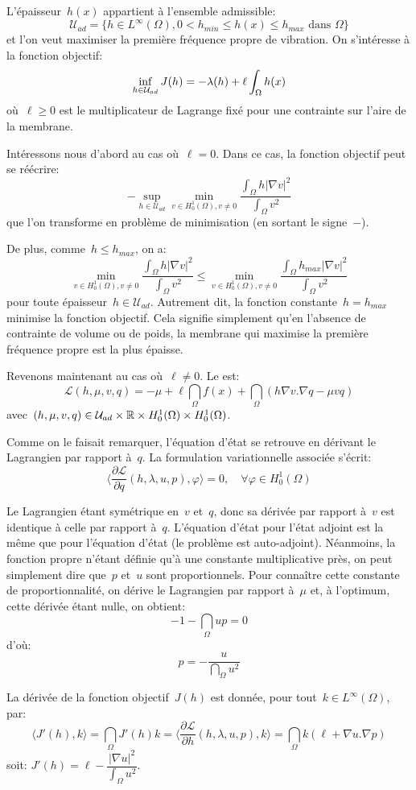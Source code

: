L'épaisseur~$h(x)$ appartient à l'ensemble admissible:
\[ \mathcal{U}_{ad} = \{ h\in L^\infty(\Omega), 0< h_{min}\le h(x)\le h_{max} \text{ dans }\Omega \} \]
et l'on veut maximiser la première fréquence propre de vibration. On s'intéresse à la fonction objectif:
\[\colorblue \inf_{h\in\mathcal{U}_{ad}} J(h) = -\lambda(h)+\ell \dint_\Omega h(x) \]
où~$\ell\ge0$ est le multiplicateur de Lagrange fixé pour une contrainte sur l'aire de la membrane.

\medskip
Intéressons nous d'abord au cas où~$\ell=0$. Dans ce cas, la fonction objectif peut se réécrire:
\[ -\sup_{h\in\mathcal{U}_{ad}} \min_{v\in H^1_0(\Omega), v\ne0} \dfrac{\int_\Omega h|\nabla v|^2}{\int_\Omega v^2} \]
que l'on transforme en problème de minimisation (en sortant le signe~$-$).

De plus, comme~$h\le h_{max}$, on a:
\[ \min_{v\in H^1_0(\Omega), v\ne0} \dfrac{\int_\Omega h|\nabla v|^2}{\int_\Omega v^2}
\le \min_{v\in H^1_0(\Omega), v\ne0} \dfrac{\int_\Omega h_{max}|\nabla v|^2}{\int_\Omega v^2} \]
pour toute épaisseur~$h\in\mathcal{U}_{ad}$. Autrement dit, la fonction constante~$h=h_{max}$ minimise la fonction objectif. Cela signifie simplement qu'en l'absence de contrainte de volume ou de poids, la membrane qui maximise la première fréquence propre est la plus épaisse.

\medskip
Revenons maintenant au cas où~$\ell\ne0$. Le  est:
\[ \mathcal{L}(h,\mu,v,q) = -\mu +\ell\dint_\Omega f(x)
+\dint_\Omega (h\nabla v.\nabla q -\mu vq)\]
avec~$(h,\mu,v,q)\in\mathcal{U}_{ad}\times\mathbb R\times H^1_0(\Omega)\times H^1_0(\Omega)$.

Comme on le faisait remarquer, l'équation d'état se retrouve en dérivant le Lagrangien par rapport à~$q$. La formulation variationnelle associée s'écrit:
\[ \langle\dfrac{\partial\mathcal{L}}{\partial q}(h,\lambda,u,p),\varphi\rangle=0,
\quad \forall \varphi\in H^1_0(\Omega) \]

Le Lagrangien étant symétrique en~$v$ et~$q$, donc sa dérivée par rapport à~$v$ est identique à celle par rapport à~$q$. L'équation d'état pour l'état adjoint est la même que pour l'équation d'état (le problème est auto-adjoint). Néanmoins, la fonction propre n'étant définie qu'à une constante multiplicative près, on peut simplement dire que~$p$ et~$u$ sont proportionnels. Pour connaître cette constante de proportionnalité, on dérive le Lagrangien par rapport à~$\mu$ et, à l'optimum, cette dérivée étant nulle, on obtient:
\[ -1-\dint_\Omega up =0 \]
d'où:
\[ p=-\dfrac{u}{\dint_\Omega u^2} \]

\medskip
La dérivée de la fonction objectif~$J(h)$ est donnée, pour tout~$k\in L^\infty(\Omega)$, par:
\[ \langle J'(h),k\rangle = \dint_\Omega J'(h)k = \langle\dfrac{\partial\mathcal{L}}{\partial h}(h,\lambda,u,p),k\rangle = \dint_\Omega k(\ell+\nabla u.\nabla p) \]
soit: $J'(h)=\ell - \dfrac{|\nabla u|^2}{\int_\Omega u^2}$.








